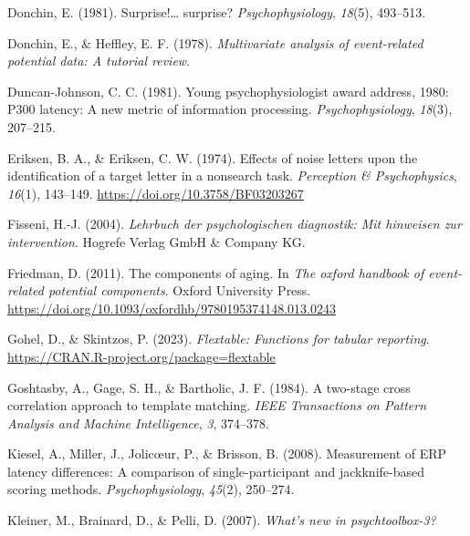 \documentclass[
  man]{apa7}
\newlength{\cslhangindent}
\newlength{\cslentryspacingunit} %
\newenvironment{CSLReferences}[2] %
 {%
  \setlength{\parindent}{0pt}
  \ifodd #1
  \let\oldpar\par
  \def\par{\hangindent=\cslhangindent\oldpar}
  \fi
  \setlength{\parskip}{#2\cslentryspacingunit}
 }%
 {}
\begin{document}
\begin{CSLReferences}{1}{0}
\leavevmode{}%
Donchin, E. (1981). Surprise!\ldots{} surprise? \emph{Psychophysiology}, \emph{18}(5), 493--513.

\leavevmode{}%
Donchin, E., \& Heffley, E. F. (1978). \emph{Multivariate analysis of event-related potential data: {A} tutorial review}.

\leavevmode{}%
Duncan-Johnson, C. C. (1981). Young psychophysiologist award address, 1980: {P300} latency: A new metric of information processing. \emph{Psychophysiology}, \emph{18}(3), 207--215.

\leavevmode{}%
Eriksen, B. A., \& Eriksen, C. W. (1974). Effects of noise letters upon the identification of a target letter in a nonsearch task. \emph{Perception \& Psychophysics}, \emph{16}(1), 143--149. \url{https://doi.org/10.3758/BF03203267}

\leavevmode{}%
Fisseni, H.-J. (2004). \emph{Lehrbuch der psychologischen diagnostik: Mit hinweisen zur intervention}. Hogrefe Verlag GmbH \& Company KG.

\leavevmode{}%
Friedman, D. (2011). The components of aging. In \emph{The oxford handbook of event-related potential components}. Oxford University Press. \url{https://doi.org/10.1093/oxfordhb/9780195374148.013.0243}

\leavevmode{}%
Gohel, D., \& Skintzos, P. (2023). \emph{Flextable: Functions for tabular reporting}. \url{https://CRAN.R-project.org/package=flextable}

\leavevmode{}%
Goshtasby, A., Gage, S. H., \& Bartholic, J. F. (1984). A two-stage cross correlation approach to template matching. \emph{IEEE Transactions on Pattern Analysis and Machine Intelligence}, \emph{3}, 374--378.

\leavevmode{}%
Kiesel, A., Miller, J., Jolicœur, P., \& Brisson, B. (2008). Measurement of {ERP} latency differences: {A} comparison of single-participant and jackknife-based scoring methods. \emph{Psychophysiology}, \emph{45}(2), 250--274.

\leavevmode{}%
Kleiner, M., Brainard, D., \& Pelli, D. (2007). \emph{What's new in psychtoolbox-3?}


\end{CSLReferences}
\end{document}
